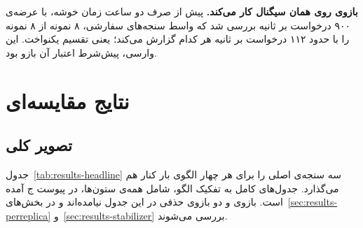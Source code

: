 \textbf{بازوی  روی همان سیگنال کار می‌کند.} پیش از صرف دو ساعت زمان خوشه، با
عرضه‌ی ۹۰۰ درخواست بر ثانیه بررسی شد که واسط سنجه‌های سفارشی، ۸ نمونه از ۸ نمونه را با حدود
۱۱۲ درخواست بر ثانیه هر کدام گزارش می‌کند؛ یعنی تقسیم یکنواخت. این وارسی، پیش‌شرط اعتبار آن
بازو بود.

\section{نتایج مقایسه‌ای}
\label{sec:results-comparison}

\subsection{تصویر کلی}
\label{sec:results-headline}

جدول~\ref{tab:results-headline} سه سنجه‌ی اصلی را برای هر چهار الگوی بار کنار هم می‌گذارد.
جدول‌های کامل به تفکیک الگو، شامل همه‌ی ستون‌ها، در پیوست ج آمده است. بازوی
 و دو بازوی حذفی در این جدول نیامده‌اند و در
بخش‌های~\ref{sec:results-perreplica} و~\ref{sec:results-stabilizer} بررسی می‌شوند.


